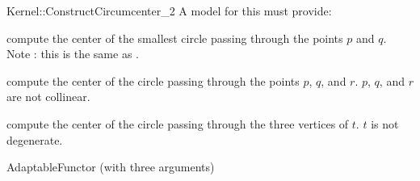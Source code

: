 \begin{ccRefFunctionObjectConcept}{Kernel::ConstructCircumcenter_2}
A model for this must provide:


 {compute the center of the smallest circle passing through the points $p$ and $q$.  Note : this is the same as . }

 {compute the center of the circle passing through the points $p$, $q$, and $r$.
  \ccPrecond $p$, $q$, and $r$ are not collinear.}

 {compute the center of the circle passing through the three vertices of $t$.
  \ccPrecond $t$ is not degenerate.}

\ccRefines
AdaptableFunctor (with three arguments)

\ccSeeAlso
{} \\

\end{ccRefFunctionObjectConcept}

